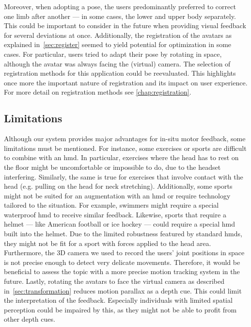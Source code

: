 Moreover, when adopting a pose, the users predominantly preferred to correct one limb after another --- in some cases, the lower and upper body separately. This could be important to consider in the future when providing visual feedback for several deviations at once. Additionally, the registration of the avatars as explained in~\autoref{sec:register} seemed to yield potential for optimization in some cases. For particular, users tried to adapt their pose by rotating in space, although the avatar was always facing the (virtual) camera. The selection of registration methods for this application could be reevaluated. This highlights once more the important nature of registration and its impact on user experience. For more detail on registration methods see \autoref{chap:registration}.

\subsection{Limitations}
Although our system provides major advantages for in-situ motor feedback, some limitations must be mentioned. For instance, some exercises or sports are difficult to combine with an \acrshort{hmd}. In particular, exercises where the head has to rest on the floor might be uncomfortable or impossible to do, due to the headset interfering. Similarly, the same is true for exercises that involve contact with the head (e.g. pulling on the head for neck stretching). Additionally, some sports might not be suited for an augmentation with an \acrshort{hmd} or require technology tailored to the situation. For example, swimmers might require a special waterproof \acrshort{hmd} to receive similar feedback. Likewise, sports that require a helmet --- like American football or ice hockey --- could require a special \acrshort{hmd} built into the helmet. Due to the limited robustness featured by standard \acrshort{hmd}s, they might not be fit for a sport with forces applied to the head area. Furthermore, the 3D camera we used to record the users' joint positions in space is not precise enough to detect very delicate movements. Therefore, it would be beneficial to assess the topic with a more precise motion tracking system in the future. Lastly, rotating the avatars to face the virtual camera as described in~\autoref{sec:transformation} reduces motion parallax as a depth cue. This could limit the interpretation of the feedback. Especially individuals with limited spatial perception could be impaired by this, as they might not be able to profit from other depth cues.

